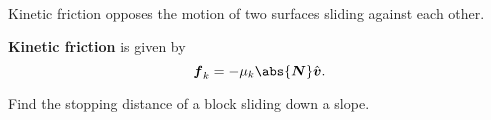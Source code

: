 \documentclass[../classical_mechanics.tex]{subfiles}
\begin{document}
        \paragraph{}
        Kinetic friction opposes the motion of two surfaces sliding against each other.
        \begin{definition}
            \textbf{Kinetic friction} is given by
            \begin{equation}
                \vec{f}_k=-\mu_k\abs{\vec{N}}\uvec{v}.
            \end{equation}
        \end{definition}
        \begin{example}
            Find the stopping distance of a block sliding down a slope.
        \end{example}
\end{document}
